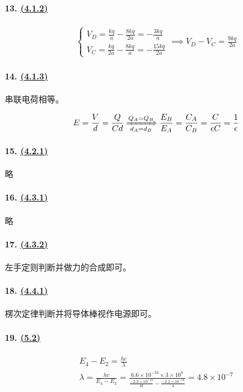 \paragraph{13. \hyperref[subsec:4.1.2]{(4.1.2)}}

\begin{gather*}
    \begin{cases}
        V_D=\frac{kq}{a}-\frac{8kq}{2a}=-\frac{3kq}{a}\\
        V_C=\frac{kq}{2a}-\frac{8kq}{a}=-\frac{15kq}{2a}
    \end{cases}\implies
    V_D-V_C=\frac{9kq}{2a}
\end{gather*}

\paragraph{14. \hyperref[subsec:4.1.3]{(4.1.3)}} 串联电荷相等。

\begin{equation*}
    E=\frac{V}{d}=\frac{Q}{Cd}\xRightarrow[d_A=d_B]{Q_A=Q_B}
    \frac{E_B}{E_A}=\frac{C_A}{C_B}=\frac{C}{\epsilon C}=\frac1\epsilon
\end{equation*}

\paragraph{15. \hyperref[subsec:4.2.1]{(4.2.1)}} 略
\paragraph{16. \hyperref[subsec:4.3.1]{(4.3.1)}} 略
\paragraph{17. \hyperref[subsec:4.3.2]{(4.3.2)}} 左手定则判断并做力的合成即可。
\paragraph{18. \hyperref[subsec:4.4.1]{(4.4.1)}} 楞次定律判断并将导体棒视作电源即可。
\paragraph{19. \hyperref[sec:5.2]{(5.2)}}

\begin{gather*}
    E_4-E_2=\frac{hc}{\lambda}\\
    \lambda=\frac{hc}{E_4-E_2}
    =\frac{6.6\times10^{-34}\times3\times10^8}{\frac{-2.2\times10^{-18}}{16}-\frac{-2.2\times10^{-18}}{4}}
    =4.8\times10^{-7}
\end{gather*}
